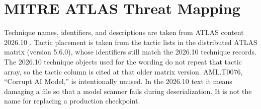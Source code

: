 \documentclass[conference]{IEEEtran}
\begin{document}
\section{MITRE ATLAS Threat Mapping}
\label{sec:atlas}
Technique names, identifiers, and descriptions are taken from ATLAS content 2026.10 \cite{mitre2026atlas}. Tactic placement is taken from the tactic lists in the distributed ATLAS matrix (version 5.6.0), whose identifiers still match the 2026.10 technique records. The 2026.10 technique objects used for the wording do not repeat that tactic array, so the tactic column is cited at that older matrix version. AML.T0076, ``Corrupt AI Model,'' is intentionally unused. In the 2026.10 text it means damaging a file so that a model scanner fails during deserialization. It is not the name for replacing a production checkpoint.
\end{document}
